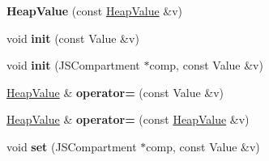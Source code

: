 \begin{DoxyCompactItemize}
\item 
\hypertarget{classjs_1_1_heap_value_a42b1676f29d8a1afebbfd6f91dabd3ae}{{\bfseries Heap\-Value} (const \hyperlink{classjs_1_1_heap_value}{Heap\-Value} \&v)}\label{classjs_1_1_heap_value_a42b1676f29d8a1afebbfd6f91dabd3ae}

\item 
\hypertarget{classjs_1_1_heap_value_a7116e3d46af038be6d816f669e8ba943}{void {\bfseries init} (const Value \&v)}\label{classjs_1_1_heap_value_a7116e3d46af038be6d816f669e8ba943}

\item 
\hypertarget{classjs_1_1_heap_value_abc774939caaf437376a504247df6263f}{void {\bfseries init} (J\-S\-Compartment $\ast$comp, const Value \&v)}\label{classjs_1_1_heap_value_abc774939caaf437376a504247df6263f}

\item 
\hypertarget{classjs_1_1_heap_value_ad22bbb3ae7cd16435aa2d94157b84b8c}{\hyperlink{classjs_1_1_heap_value}{Heap\-Value} \& {\bfseries operator=} (const Value \&v)}\label{classjs_1_1_heap_value_ad22bbb3ae7cd16435aa2d94157b84b8c}

\item 
\hypertarget{classjs_1_1_heap_value_a3e4b70c826d5f2719aa7bee28a2ac7a7}{\hyperlink{classjs_1_1_heap_value}{Heap\-Value} \& {\bfseries operator=} (const \hyperlink{classjs_1_1_heap_value}{Heap\-Value} \&v)}\label{classjs_1_1_heap_value_a3e4b70c826d5f2719aa7bee28a2ac7a7}

\item 
\hypertarget{classjs_1_1_heap_value_a573f94e4857d0039ad79cd56e5a5ddb7}{void {\bfseries set} (J\-S\-Compartment $\ast$comp, const Value \&v)}\label{classjs_1_1_heap_value_a573f94e4857d0039ad79cd56e5a5ddb7}

\end{DoxyCompactItemize}
